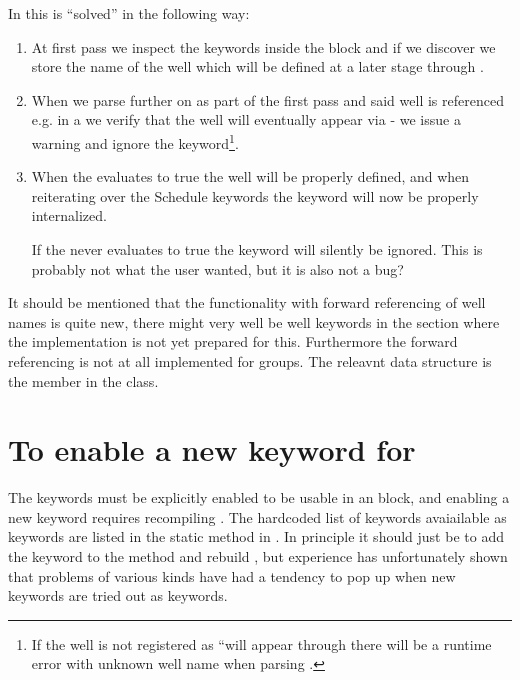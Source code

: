 In \flow{} this is ``solved'' in the following way:
\begin{enumerate}
\item At first pass we inspect the keywords inside the \actionx{} block and if
  we discover  we store the name of the well which will be defined
  at a later stage through \actionx{}.
\item When we parse further on as part of the first pass and said well is
  referenced e.g. in a  we verify that the well will eventually
  appear via \actionx{} - we issue a warning and ignore the 
  keyword\footnote{If the well is not registered as ``will appear through
  \actionx{} there will be a runtime error with unknown well name when parsing
  .}.
\item When the \actionx{} evaluates to true the well will be properly defined,
  and when reiterating over the Schedule keywords the  keyword will
  now be properly internalized.

  If the \actionx{} never evaluates to true the  keyword will
  silently be ignored. This is probably not what the user wanted, but it is also
  not a bug?
\end{enumerate}
It should be mentioned that the functionality with forward referencing of well
names is quite new, there might very well be well keywords in the 
section where the implementation is not yet prepared for this. Furthermore the
forward referencing is not at all implemented for groups. The releavnt data
structure is the member  in the
 class.


\section{To enable a new keyword for \actionx}
The keywords must be explicitly enabled to be usable in an \actionx{} block, and
enabling a new keyword requires recompiling \flow{}. The hardcoded list of
keywords avaiailable as \actionx{} keywords are listed in the static method
 in
. In principle it should
just be to add the keyword to the  method
and rebuild \flow{}, but experience has unfortunately shown that problems of
various kinds have had a tendency to pop up when new keywords are tried out as
\actionx{} keywords.

